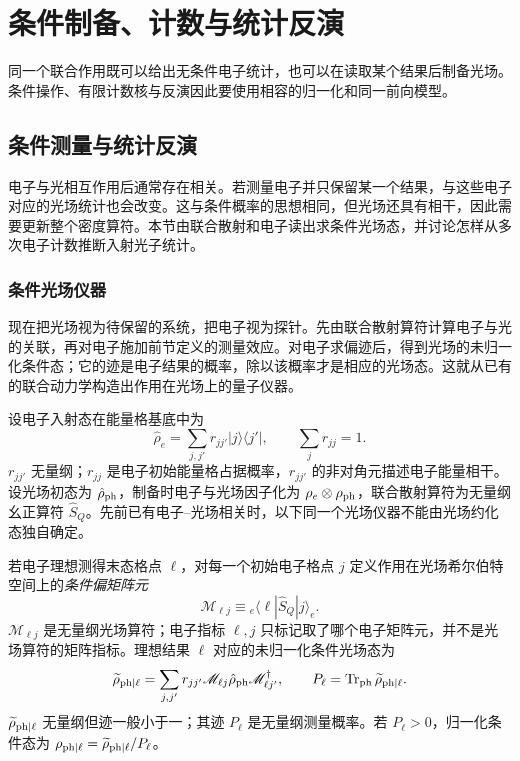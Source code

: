 \chapter{条件制备、计数与统计反演}\label{chap:conditional-electron-inference}

同一个联合作用既可以给出无条件电子统计，也可以在读取某个结果后制备光场。条件操作、有限计数核与反演因此要使用相容的归一化和同一前向模型。

\section{条件测量与统计反演}

电子与光相互作用后通常存在相关。若测量电子并只保留某一个结果，与这些电子对应的光场统计也会改变。这与条件概率的思想相同，但光场还具有相干，因此需要更新整个密度算符。本节由联合散射和电子读出求条件光场态，并讨论怎样从多次电子计数推断入射光子统计。

\subsection{条件光场仪器}

现在把光场视为待保留的系统，把电子视为探针。先由联合散射算符计算电子与光的关联，再对电子施加前节定义的测量效应。对电子求偏迹后，得到光场的未归一化条件态；它的迹是电子结果的概率，除以该概率才是相应的光场态。这就从已有的联合动力学构造出作用在光场上的量子仪器。

设电子入射态在能量格基底中为
\begin{equation*}
\hat\rho_e
=\sum_{j,j'}r_{jj'}|j\rangle\langle j'|,
\qquad
\sum_j r_{jj}=1.
\end{equation*}
$r_{jj'}$ 无量纲；$r_{jj}$ 是电子初始能量格占据概率，$r_{jj'}$ 的非对角元描述电子能量相干。设光场初态为 $\hat\rho_{\rm ph}$，制备时电子与光场因子化为 $\rho_e\otimes\rho_{\rm ph}$，联合散射算符为无量纲幺正算符 $\hat S_Q$。先前已有电子--光场相关时，以下同一个光场仪器不能由光场约化态独自确定。

若电子理想测得末态格点 $\ell$，对每一个初始电子格点 $j$ 定义作用在光场希尔伯特空间上的\emph{条件偏矩阵元}
\begin{equation*}
\mathscr M_{\ell j}
\equiv {}_e\!\langle\ell|\hat S_Q|j\rangle_e.
\end{equation*}
$\mathscr M_{\ell j}$ 是无量纲光场算符；电子指标 $\ell,j$ 只标记取了哪个电子矩阵元，并不是光场算符的矩阵指标。理想结果 $\ell$ 对应的未归一化条件光场态为
\begin{equation}
{
\widetilde\rho_{\rm ph|\ell}
=\sum_{j,j'}r_{jj'}
\mathscr M_{\ell j}\hat\rho_{\rm ph}
\mathscr M_{\ell j'}^\dagger,
\qquad
P_\ell
=\operatorname{Tr}_{\rm ph}\widetilde\rho_{\rm ph|\ell}.}
\label{eq:general_electron_meter_conditional_photon_map}
\end{equation}
$\widetilde\rho_{\rm ph|\ell}$ 无量纲但迹一般小于一；其迹 $P_\ell$ 是无量纲测量概率。若 $P_\ell>0$，归一化条件态为 $\rho_{\rm ph|\ell}=\widetilde\rho_{\rm ph|\ell}/P_\ell$。

